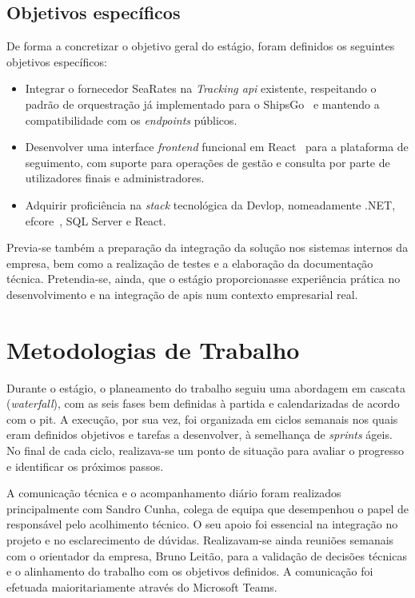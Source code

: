 \subsection{Objetivos específicos}

De forma a concretizar o objetivo geral do estágio, foram definidos os seguintes objetivos específicos:
\begin{itemize}
  \item Integrar o fornecedor SeaRates na \textit{Tracking \gls{api}} existente, respeitando o padrão de orquestração já implementado para o ShipsGo~\cite{shipsgo} e mantendo a compatibilidade com os \textit{endpoints} públicos.
  \item Desenvolver uma interface \textit{frontend} funcional em React~\cite{react} para a plataforma de seguimento, com suporte para operações de gestão e consulta por parte de utilizadores finais e administradores.
  \item Adquirir proficiência na \textit{stack} tecnológica da Devlop, nomeadamente .NET, \gls{efcore}~\cite{efcore}, SQL Server e React.
\end{itemize}

Previa-se também a preparação da integração da solução nos sistemas internos da empresa, bem como a realização de testes e a elaboração da documentação técnica. Pretendia-se, ainda, que o estágio proporcionasse experiência prática no desenvolvimento e na integração de \glspl{api} num contexto empresarial real.

\section{Metodologias de Trabalho}

Durante o estágio, o planeamento do trabalho seguiu uma abordagem em cascata (\textit{waterfall}), com as seis fases bem definidas à partida e calendarizadas de acordo com o \gls{pit}. A execução, por sua vez, foi organizada em ciclos semanais nos quais eram definidos objetivos e tarefas a desenvolver, à semelhança de \textit{sprints} ágeis. No final de cada ciclo, realizava-se um ponto de situação para avaliar o progresso e identificar os próximos passos.

A comunicação técnica e o acompanhamento diário foram realizados principalmente com Sandro Cunha, colega de equipa que desempenhou o papel de responsável pelo acolhimento técnico. O seu apoio foi essencial na integração no projeto e no esclarecimento de dúvidas. Realizavam-se ainda reuniões semanais com o orientador da empresa, Bruno Leitão, para a validação de decisões técnicas e o alinhamento do trabalho com os objetivos definidos. A comunicação foi efetuada maioritariamente através do Microsoft Teams.


